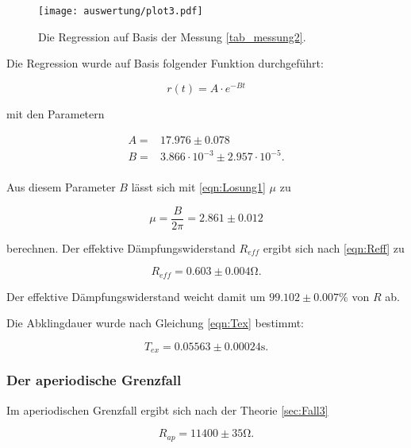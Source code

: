 \begin{figure}[H]
  \centering
  \texttt{[image: auswertung/plot3.pdf]}
  \caption{Die Regression auf Basis der Messung \ref{tab_messung2}.}
  \label{fig:regrmessung2}
\end{figure}

Die Regression wurde auf Basis folgender Funktion durchgeführt:

\begin{equation*}
  r(t) = A \cdot e^{-B t}
\end{equation*}

mit den Parametern

\begin{align*}
  A  = & 17.976 \pm  0.078 \\
  B  = & 3.866 \cdot 10^{-3} \pm 2.957 \cdot 10^{-5}. \\
\end{align*}

Aus diesem Parameter $B$ lässt sich mit \eqref{eqn:Losung1} $\mu$ zu

\begin{equation}
  \mu = \frac{B}{2 \pi} = 2.861 \pm 0.012
  \label{eqn:mu}
\end{equation}
\noindent

berechnen.
Der effektive Dämpfungswiderstand $R_{eff}$ ergibt sich nach \eqref{eqn:Reff} zu

\begin{equation}
  R_{eff} = 0.603   \pm 0.004 \si{\ohm}.
  \label{eqn:reffauswertung}
\end{equation}
\noindent

Der effektive Dämpfungswiderstand weicht damit um $ 99.102 \pm 0.007 \si{\percent}$ von $R$ ab.

Die Abklingdauer wurde nach Gleichung \eqref{eqn:Tex} bestimmt:

\begin{equation}
  T_{ex} = 0.05563 \pm 0.00024 \si{\second}.
  \label{eqn:texauswerung}
\end{equation}
\noindent

\subsubsection{Der aperiodische Grenzfall}
Im aperiodischen Grenzfall ergibt sich nach der Theorie \ref{sec:Fall3}

\begin{equation}
  R_{ap} =  11400 \pm 35 \si{\ohm}.
  \label{eqn:rapausw1}
\end{equation}

